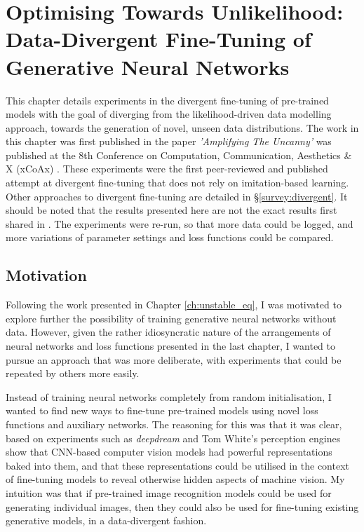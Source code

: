 \chapter{Optimising Towards Unlikelihood: Data-Divergent Fine-Tuning of Generative Neural Networks}
\label{ch:divergent}

This chapter details experiments in the divergent fine-tuning of pre-trained models with the goal of diverging from the likelihood-driven data modelling approach, towards the generation of novel, unseen data distributions.
The work in this chapter was first published in the paper \textit{'Amplifying The Uncanny'} was published at the 8th Conference on Computation, Communication, Aesthetics \& X (xCoAx) \citep{broad2020amplifying}. 
These experiments were the first peer-reviewed and published attempt at divergent fine-tuning that does not rely on imitation-based learning. Other approaches to divergent fine-tuning are detailed in \S \ref{survey:divergent}. 
It should be noted that the results presented here are not the exact results first shared in \cite{broad2020amplifying}. The experiments were re-run, so that more data could be logged, and more variations of parameter settings and loss functions could be compared.

\section{Motivation}
\label{c4:sec:motivation}

Following the work presented in Chapter \ref{ch:unstable_eq}, I was motivated to explore further the possibility of training generative neural networks without data. 
However, given the rather idiosyncratic nature of the arrangements of neural networks and loss functions presented in the last chapter, I wanted to pursue an approach that was more deliberate, with experiments that could be repeated by others more easily. 

Instead of training neural networks completely from random initialisation, I wanted to find new ways to fine-tune pre-trained models using novel loss functions and auxiliary networks. 
The reasoning for this was that it was clear, based on experiments such as \textit{deepdream} \citep{mordvintsev2015inceptionism} and Tom White's perception engines \citep{white2018perception,white2019shared} show that CNN-based computer vision models had powerful representations baked into them, and that these representations could be utilised in the context of fine-tuning models to reveal otherwise hidden aspects of machine vision.
My intuition was that if pre-trained image recognition models could be used for generating individual images, then they could also be used for fine-tuning existing generative models, in a data-divergent fashion.

